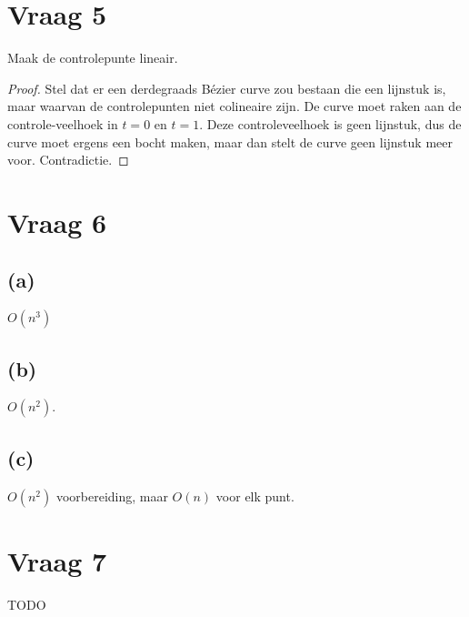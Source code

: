 \documentclass[10pt,a4paper]{article}
\begin{document}
\section{Vraag 5}
Maak de controlepunte lineair.
\begin{proof}
Stel dat er een derdegraads B\'ezier curve zou bestaan die een lijnstuk is, maar waarvan de controlepunten niet colineaire zijn. De curve moet raken aan de controle-veelhoek in $t=0$ en $t=1$. Deze controleveelhoek is geen lijnstuk, dus de curve moet ergens een bocht maken, maar dan stelt de curve geen lijnstuk meer voor. Contradictie.
\end{proof}

\section{Vraag 6}
\subsection*{(a)}
$O(n^3)$

\subsection*{(b)}
$O(n^2)$.

\subsection*{(c)}
$O(n^2)$ voorbereiding, maar $O(n)$ voor elk punt.

\section{Vraag 7}
TODO


\end{document}
